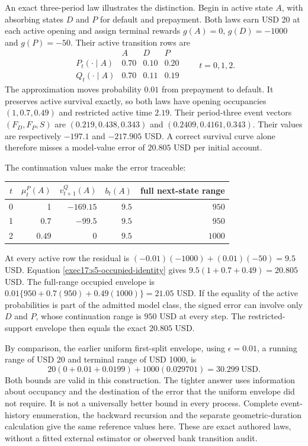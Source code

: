 An exact three-period law illustrates the distinction. Begin in active state
$A$, with absorbing states $D$ and $P$ for default and prepayment. Both laws
earn USD 20 at each active opening and assign terminal rewards
$g(A)=0$, $g(D)=-1000$ and $g(P)=-50$. Their active transition rows are
\begin{equation}
 \begin{array}{c|ccc}
       & A & D & P\\\hline
 P_t(\cdot\mid A)&0.70&0.10&0.20\\
 Q_t(\cdot\mid A)&0.70&0.11&0.19
 \end{array}
 \qquad t=0,1,2.
 \label{exec17:s5-occupied-laws}
\end{equation}
The approximation moves probability $0.01$ from prepayment to default. It
preserves active survival exactly, so both laws have opening occupancies
$(1,0.7,0.49)$ and restricted active time $2.19$. Their period-three event
vectors $(F_D,F_P,S)$ are $(0.219,0.438,0.343)$ and
$(0.2409,0.4161,0.343)$. Their values are respectively $-197.1$ and
$-217.905$ USD. A correct survival curve alone therefore misses a model-value
error of $20.805$ USD per initial account.

The continuation values make the error traceable:
\begin{center}
\begin{tabular}{c r r r r}
\toprule
$t$ & $\mu^P_t(A)$ & $v^Q_{t+1}(A)$ & $b_t(A)$ & full next-state range\\
\midrule
0 & 1 & $-169.15$ & $9.5$ & $950$\\
1 & $0.7$ & $-99.5$ & $9.5$ & $950$\\
2 & $0.49$ & $0$ & $9.5$ & $1000$\\
\bottomrule
\end{tabular}
\end{center}
At every active row the residual is
$(-0.01)(-1000)+(0.01)(-50)=9.5$ USD. Equation
\eqref{exec17:s5-occupied-identity} gives
$9.5(1+0.7+0.49)=20.805$ USD. The full-range occupied envelope is
$0.01\{950+0.7(950)+0.49(1000)\}=21.05$ USD. If the equality of the
active probabilities is part of the admitted model class, the signed error
can involve only $D$ and $P$, whose continuation range is $950$ USD at every
step. The restricted-support envelope then equals the exact $20.805$ USD.

By comparison, the earlier uniform first-split envelope, using $\epsilon=0.01$,
a running range of USD 20 and terminal range of USD 1000, is
\begin{equation}
 20(0+0.01+0.0199)+1000(0.029701)=30.299\ \mathrm{USD}.
 \label{exec17:s5-occupied-comparison}
\end{equation}
Both bounds are valid in this construction. The tighter answer uses
information about occupancy and the destination of the error that the
uniform envelope did not require. It is not a universally better bound in
every process. Complete event-history enumeration, the backward recursion
and the separate geometric-duration calculation give the same reference
values here. These are exact authored laws, without a fitted external
estimator or observed bank transition audit.~\citep{exec17_s5_occupied}

